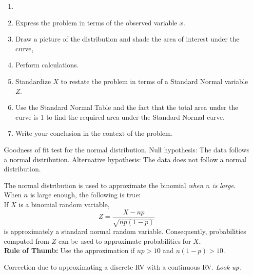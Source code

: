 \documentclass[]{article}
\newenvironment{definitions}{
	\begin{description}[font=\sffamily\bfseries, leftmargin=1cm, style=nextline]
	}{
	\end{description}
}
\begin{document}
\begin{definitions}
	\begin{enumerate}[itemsep=0pt]\item[]
		\item Express the problem in terms of the observed variable $x$.
		\item Draw a picture of the distribution and shade the area of interest under the curve,
		\item Perform calculations.
		\item Standardize $X$ to restate the problem in terms of a Standard Normal variable $Z$.
		\item Use the Standard Normal Table and the fact that the total area under the curve is 1 to find the required area under the Standard Normal curve.
		\item Write your conclusion in the context of the problem.
	\end{enumerate}
	\item[Shapiro-Wilk test]
	Goodness of fit test for the normal distribution. Null hypothesis: The data follows a normal distribution. Alternative hypothesis: The data does not follow a normal distribution.
	\item[Normal Approximation to the Binomial]
	The normal distribution is used to approximate the binomial \emph{when $n$ is large}. When $n$ is large enough, the following is true:\\
	If $X$ is a binomial random variable,
	\[ Z = \frac{X - np}{\sqrt{np(1 - p)}}\]
	is approximately a standard normal random variable. Consequently, probabilities computed from $Z$ can be used to approximate probabilities for $X$.\\
	\textbf{Rule of Thumb:} Use the approximation if $np > 10$ and $n(1-p) > 10$.
	\item[Continuity Correction Factor]
	Correction due to approximating a discrete RV with a continuous RV. \emph{Look up.}
\end{definitions}
\end{document}
